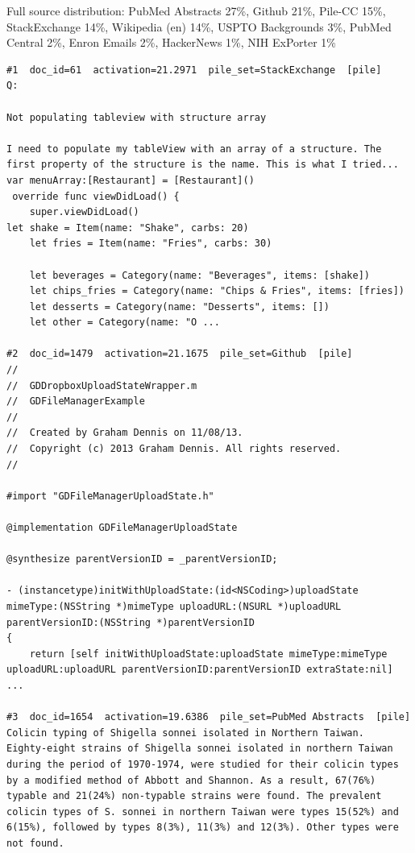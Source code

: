 Full source distribution: PubMed Abstracts 27\%, Github 21\%, Pile-CC 15\%, StackExchange 14\%, Wikipedia (en) 14\%, USPTO Backgrounds 3\%, PubMed Central 2\%, Enron Emails 2\%, HackerNews 1\%, NIH ExPorter 1\%

\begin{verbatim}
#1  doc_id=61  activation=21.2971  pile_set=StackExchange  [pile]
Q:

Not populating tableview with structure array

I need to populate my tableView with an array of a structure. The first property of the structure is the name. This is what I tried...
var menuArray:[Restaurant] = [Restaurant]()
 override func viewDidLoad() {
    super.viewDidLoad()
let shake = Item(name: "Shake", carbs: 20)
    let fries = Item(name: "Fries", carbs: 30)

    let beverages = Category(name: "Beverages", items: [shake])
    let chips_fries = Category(name: "Chips & Fries", items: [fries])
    let desserts = Category(name: "Desserts", items: [])
    let other = Category(name: "O ...

#2  doc_id=1479  activation=21.1675  pile_set=Github  [pile]
//
//  GDDropboxUploadStateWrapper.m
//  GDFileManagerExample
//
//  Created by Graham Dennis on 11/08/13.
//  Copyright (c) 2013 Graham Dennis. All rights reserved.
//

#import "GDFileManagerUploadState.h"

@implementation GDFileManagerUploadState

@synthesize parentVersionID = _parentVersionID;

- (instancetype)initWithUploadState:(id<NSCoding>)uploadState mimeType:(NSString *)mimeType uploadURL:(NSURL *)uploadURL parentVersionID:(NSString *)parentVersionID
{
    return [self initWithUploadState:uploadState mimeType:mimeType uploadURL:uploadURL parentVersionID:parentVersionID extraState:nil] ...

#3  doc_id=1654  activation=19.6386  pile_set=PubMed Abstracts  [pile]
Colicin typing of Shigella sonnei isolated in Northern Taiwan.
Eighty-eight strains of Shigella sonnei isolated in northern Taiwan during the period of 1970-1974, were studied for their colicin types by a modified method of Abbott and Shannon. As a result, 67(76%) typable and 21(24%) non-typable strains were found. The prevalent colicin types of S. sonnei in northern Taiwan were types 15(52%) and 6(15%), followed by types 8(3%), 11(3%) and 12(3%). Other types were not found.


\end{verbatim}

